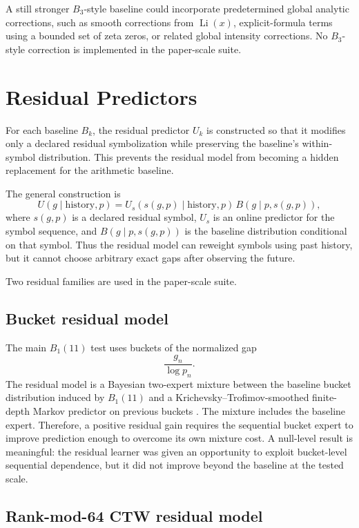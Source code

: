 \documentclass[11pt]{article}
\begin{document}
A still stronger $B_3$-style baseline could incorporate predetermined global analytic corrections, such as smooth corrections from $\operatorname{Li}(x)$, explicit-formula terms using a bounded set of zeta zeros, or related global intensity corrections. No $B_3$-style correction is implemented in the paper-scale suite.

\section{Residual Predictors}

For each baseline $B_k$, the residual predictor $U_k$ is constructed so that it modifies only a declared residual symbolization while preserving the baseline's within-symbol distribution. This prevents the residual model from becoming a hidden replacement for the arithmetic baseline.

The general construction is
\[
U(g\mid \text{history},p)=
U_s(s(g,p)\mid\text{history},p)\,B(g\mid p,s(g,p)),
\]
where $s(g,p)$ is a declared residual symbol, $U_s$ is an online predictor for the symbol sequence, and $B(g\mid p,s(g,p))$ is the baseline distribution conditional on that symbol. Thus the residual model can reweight symbols using past history, but it cannot choose arbitrary exact gaps after observing the future.

Two residual families are used in the paper-scale suite.

\subsection{Bucket residual model}

The main $B_1(11)$ test uses buckets of the normalized gap
\[
\frac{g_n}{\log p_n}.
\]
The residual model is a Bayesian two-expert mixture between the baseline bucket distribution induced by $B_1(11)$ and a Krichevsky--Trofimov-smoothed finite-depth Markov predictor on previous buckets \citep{krichevskytrofimov1981,rissanen1984}. The mixture includes the baseline expert. Therefore, a positive residual gain requires the sequential bucket expert to improve prediction enough to overcome its own mixture cost. A null-level result is meaningful: the residual learner was given an opportunity to exploit bucket-level sequential dependence, but it did not improve beyond the baseline at the tested scale.

\subsection{Rank-mod-64 CTW residual model}
\end{document}
